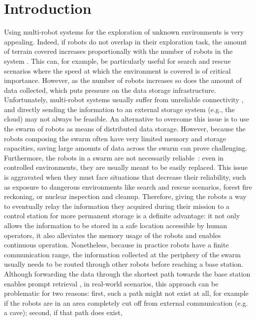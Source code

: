 \section{Introduction}
Using multi-robot systems for the exploration of unknown environments
is very appealing. Indeed, if robots do not overlap in their
exploration task, the amount of terrain covered increases
proportionally with the number of robots in the system
\cite{burgard2005coordinated}. This can, for example, be particularly
useful for search and rescue scenarios \cite{kantor2003search} where
the speed at which the environment is covered is of critical
importance. However, as the number of robots increases so does the
amount of data collected, which puts pressure on the data storage infrastructure. 
Unfortunately, multi-robot systems usually
suffer from unreliable connectivity \cite{amigoni2017multirobot}, and
directly sending the information to an external storage system
(e.g., the cloud) may not always be feasible. An alternative
to overcome this issue is to use the swarm of
robots as means of distributed data storage. However, because the robots composing the swarm often have very limited memory and storage capacities, saving
large amounts of data across the swarm can prove
challenging. Furthermore, the robots in a swarm are not necessarily
reliable~\cite{winfield2006safety}: even in controlled environments, 
they are usually meant to be easily replaced. This issue
is aggravated when they must face situations that decrease their
reliability, such as exposure to dangerous environments like
search and rescue scenarios, forest fire reckoning, or nuclear
inspection and cleanup. Therefore, giving the robots a way to
eventually relay the information they acquired during their mission to
a control station for more permanent storage is a definite
advantage: it not only allows the information to be stored in a safe
location accessible by human operators, it also alleviates the memory
usage of the robots and enables continuous operation.  Nonetheless,
because in practice robots have a finite communication range, the
information collected at the periphery of the swarm usually needs to
be routed through other robots before reaching a base
station. Although forwarding the data through the shortest path
towards the base station enables prompt retrieval
\cite{dutta2020efficient}, in real-world scenarios, this approach can
be problematic for two reasons: first, such a path might not exist at
all, for example if the robots are in an area completely cut off from
external communication (e.g. a cave); second, if that path does exist,
